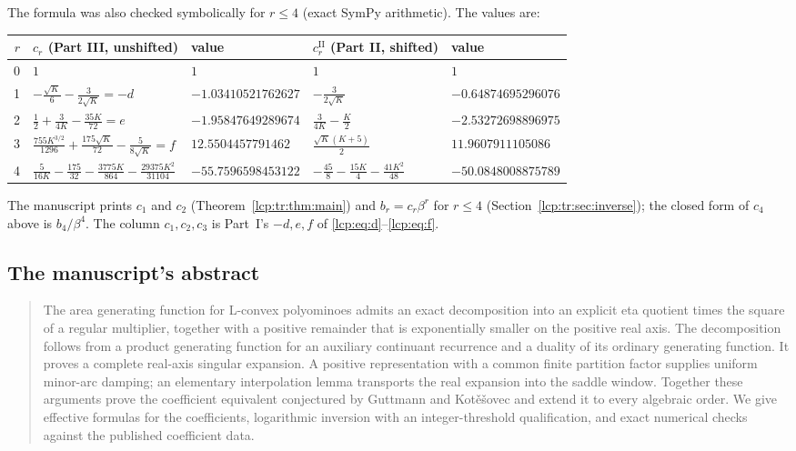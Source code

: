 \documentclass[11pt]{article}
\numberwithin{equation}{section}
\theoremstyle{definition}\newtheorem{definition}[theorem]{Definition}
\theoremstyle{remark}\newtheorem{remark}[theorem]{Remark}
\begin{document}
The formula was also checked symbolically for $r\le4$ (exact SymPy
arithmetic). The values are:
\begin{center}\small
\begin{tabular}{@{}r l l l l@{}}
\toprule
$r$ & $c_r$ (Part III, unshifted) & value & $c_r^{\mathrm{II}}$ (Part II, shifted) & value\\
\midrule
0 & $1$ & $1$ & $1$ & $1$\\
1 & $-\frac{\sqrt K}6-\frac3{2\sqrt K}=-d$ & $-1.03410521762627$ & $-\frac3{2\sqrt K}$ & $-0.64874695296076$\\
2 & $\frac12+\frac3{4K}-\frac{35K}{72}=e$ & $-1.95847649289674$ & $\frac3{4K}-\frac K2$ & $-2.53272698896975$\\
3 & $\frac{755K^{3/2}}{1296}+\frac{175\sqrt K}{72}-\frac5{8\sqrt K}=f$ & $12.5504457791462$ & $\frac{\sqrt K(K+5)}2$ & $11.9607911105086$\\
4 & $\frac5{16K}-\frac{175}{32}-\frac{3775K}{864}-\frac{29375K^2}{31104}$ & $-55.7596598453122$ & $-\frac{45}8-\frac{15K}4-\frac{41K^2}{48}$ & $-50.0848008875789$\\
\bottomrule
\end{tabular}
\end{center}
The manuscript prints $c_1$ and $c_2$ (Theorem~\ref{lcp:tr:thm:main}) and
$b_r=c_r\beta^r$ for $r\le4$ (Section~\ref{lcp:tr:sec:inverse}); the closed
form of $c_4$ above is $b_4/\beta^4$. The column $c_1,c_2,c_3$ is Part~I's
$-d,e,f$ of \eqref{lcp:eq:d}--\eqref{lcp:eq:f}.

\subsection{The manuscript's abstract}
\begin{quote}\small
The area generating function for L-convex polyominoes admits an exact decomposition into an explicit eta quotient times the square of a regular multiplier, together with a positive remainder that is exponentially smaller on the positive real axis. The decomposition follows from a product generating function for an auxiliary continuant recurrence and a duality of its ordinary generating function. It proves a complete real-axis singular expansion. A positive representation with a common finite partition factor supplies uniform minor-arc damping; an elementary interpolation lemma transports the real expansion into the saddle window. Together these arguments prove the coefficient equivalent conjectured by Guttmann and Kot\v e\v sovec and extend it to every algebraic order. We give effective formulas for the coefficients, logarithmic inversion with an integer-threshold qualification, and exact numerical checks against the published coefficient data.
\end{quote}
\end{document}

